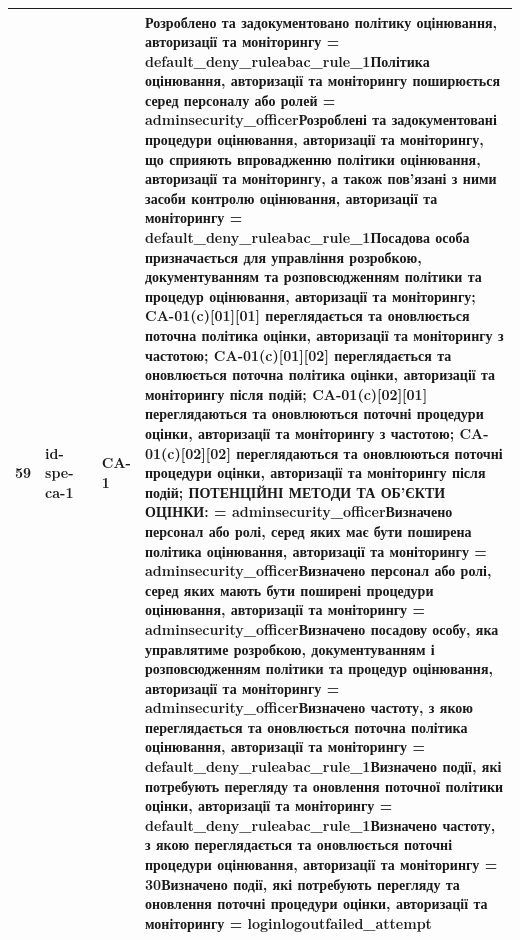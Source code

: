 \documentclass[10pt]{article}
\begin{document}
\begin{longtable}{|c|>{\raggedright\arraybackslash}p{2.5cm}|>{\raggedright\arraybackslash}p{4.5cm}|>{\raggedright\arraybackslash}p{3cm}|>{\raggedright\arraybackslash}p{4.5cm}|}
59 & id-spe-ca-1 &  & CA-1 & Розроблено та задокументовано політику оцінювання, авторизації та моніторингу = \textbf{default\_\allowbreak{}deny\_\allowbreak{}ruleabac\_\allowbreak{}rule\_\allowbreak{}1}\newline Політика оцінювання, авторизації та моніторингу поширюється серед персоналу або ролей = \textbf{adminsecurity\_\allowbreak{}officer}\newline Розроблені та задокументовані процедури оцінювання, авторизації та моніторингу, що сприяють впровадженню політики оцінювання, авторизації та моніторингу, а також пов'язані з ними засоби контролю оцінювання, авторизації та моніторингу = \textbf{default\_\allowbreak{}deny\_\allowbreak{}ruleabac\_\allowbreak{}rule\_\allowbreak{}1}\newline Посадова особа призначається для управління розробкою, документуванням та розповсюдженням політики та процедур оцінювання, авторизації та моніторингу; CA-01(c)[01][01] переглядається та оновлюється поточна політика оцінки, авторизації та моніторингу з частотою; CA-01(c)[01][02] переглядається та оновлюється поточна політика оцінки, авторизації та моніторингу після подій; CA-01(c)[02][01] переглядаються та оновлюються поточні процедури оцінки, авторизації та моніторингу з частотою; CA-01(c)[02][02] переглядаються та оновлюються поточні процедури оцінки, авторизації та моніторингу після подій; ПОТЕНЦІЙНІ МЕТОДИ ТА ОБ'ЄКТИ ОЦІНКИ: = \textbf{adminsecurity\_\allowbreak{}officer}\newline Визначено персонал або ролі, серед яких має бути поширена політика оцінювання, авторизації та моніторингу = \textbf{adminsecurity\_\allowbreak{}officer}\newline Визначено персонал або ролі, серед яких мають бути поширені процедури оцінювання, авторизації та моніторингу = \textbf{adminsecurity\_\allowbreak{}officer}\newline Визначено посадову особу, яка управлятиме розробкою, документуванням і розповсюдженням політики та процедур оцінювання, авторизації та моніторингу = \textbf{adminsecurity\_\allowbreak{}officer}\newline Визначено частоту, з якою переглядається та оновлюється поточна політика оцінювання, авторизації та моніторингу = \textbf{default\_\allowbreak{}deny\_\allowbreak{}ruleabac\_\allowbreak{}rule\_\allowbreak{}1}\newline Визначено події, які потребують перегляду та оновлення поточної політики оцінки, авторизації та моніторингу = \textbf{default\_\allowbreak{}deny\_\allowbreak{}ruleabac\_\allowbreak{}rule\_\allowbreak{}1}\newline Визначено частоту, з якою переглядається та оновлюється поточні процедури оцінювання, авторизації та моніторингу = \textbf{30}\newline Визначено події, які потребують перегляду та оновлення поточні процедури оцінки, авторизації та моніторингу = \textbf{loginlogoutfailed\_\allowbreak{}attempt} \\ \hline

\end{longtable}
\end{document}
